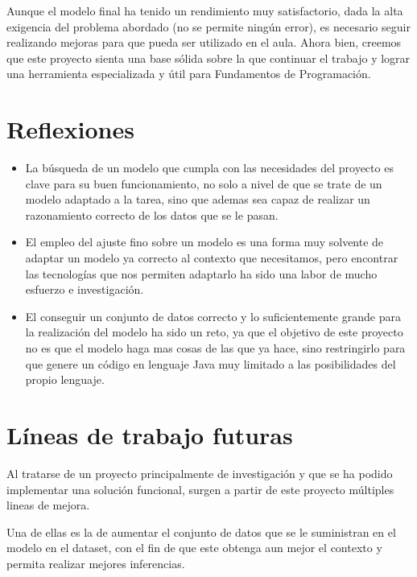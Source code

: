 Aunque el modelo final ha tenido un rendimiento muy satisfactorio, dada la alta exigencia del problema abordado (no se permite ningún error), es necesario seguir realizando mejoras para que pueda ser utilizado en el aula. Ahora bien, creemos que este proyecto sienta una base sólida sobre la que continuar el trabajo y lograr una herramienta especializada y útil para Fundamentos de Programación.


\section{Reflexiones}

\begin{itemize}
    \item La búsqueda de un modelo que cumpla con las necesidades del proyecto es clave para su buen funcionamiento, no solo a nivel de que se trate de un modelo adaptado a la tarea, sino que ademas sea capaz de realizar un razonamiento correcto de los datos que se le pasan.

    \item El empleo del ajuste fino sobre un modelo es una forma muy solvente de adaptar un modelo ya correcto al contexto que necesitamos, pero encontrar las tecnologías que nos permiten adaptarlo ha sido una labor de mucho esfuerzo e investigación.

    \item El conseguir un conjunto de datos correcto y lo suficientemente grande para la realización del modelo ha sido un reto, ya que el objetivo de este proyecto no es que el modelo haga mas cosas de las que ya hace, sino restringirlo para que genere un código en lenguaje Java muy limitado a las posibilidades del propio lenguaje.

\end{itemize}

\section{Líneas de trabajo futuras}
\label{ap:lineas de trabajo futuras}
Al tratarse de un proyecto principalmente de investigación y que se ha podido implementar una solución funcional, surgen a partir de este proyecto múltiples lineas de mejora.

Una de ellas es la de aumentar el conjunto de datos que se le suministran en el modelo en el dataset, con el fin de que este obtenga aun mejor el contexto y permita realizar mejores inferencias.


